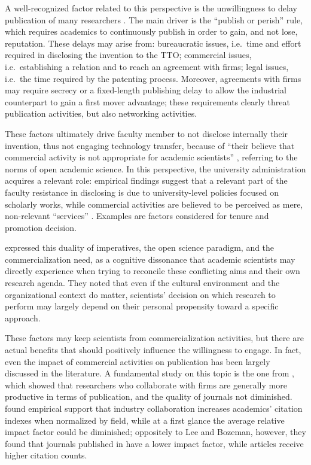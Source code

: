 A well-recognized factor related to this perspective is the unwillingness to delay publication of many researchers \citep{Thursby2002, OShea2004, Baldini2007}. The main driver is the \enquote{publish or perish} rule, which requires academics to continuously publish in order to gain, and not lose, reputation. These delays may arise from: bureaucratic issues, i.e.\ time and effort required in disclosing the invention to the TTO; commercial issues, i.e.\ establishing a relation and to reach an agreement with firms; legal issues, i.e.\ the time required by the patenting process. Moreover, agreements with firms may require secrecy or a fixed-length publishing delay to allow the industrial counterpart to gain a first mover advantage; these requirements clearly threat publication activities, but also networking activities. 

These factors ultimately drive faculty member to not disclose internally their invention, thus not engaging technology transfer, because of \enquote{their believe that commercial activity is not appropriate for academic scientists} \citep{Bercovitz2006}, referring to the norms of open academic science.  In this perspective, the university administration acquires a relevant role: empirical findings suggest that a relevant part of the faculty resistance in disclosing is due to university-level policies focused on scholarly works, while commercial activities are believed to be perceived as mere, non-relevant \enquote{services} \citep{Markman2005}. Examples are factors considered for tenure and promotion decision.

\citet{Muscio2013} expressed this duality of imperatives, the open science paradigm, and the commercialization need, as a cognitive dissonance that academic scientists may directly experience when trying to reconcile these conflicting aims and their own research agenda. They noted that even if the cultural environment and the organizational context do matter, scientists' decision on which research to perform may largely depend on their personal propensity toward a specific approach.

These factors may keep scientists from commercialization activities, but there are actual benefits that should positively influence the willingness to engage. In fact, even the impact of commercial activities on publication has been largely discussed in the literature. A fundamental study on this topic is the one from \citet{Lee2005}, which showed that researchers who collaborate with firms are generally more productive in terms of publication, and the quality of journals not diminished. \citet{Lebeau2008} found empirical support that industry collaboration increases academics' citation indexes when normalized by field, while at a first glance the average relative impact factor could be diminished; oppositely to Lee and Bozeman, however, they found that journals published in have a lower impact factor, while articles receive higher citation counts.

